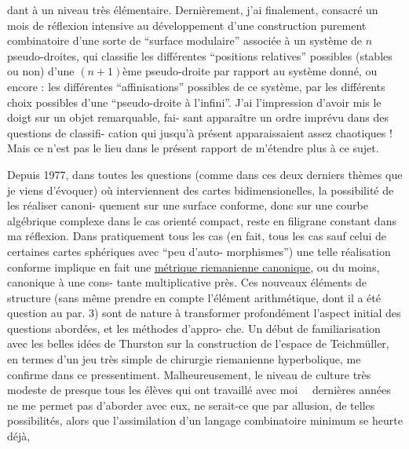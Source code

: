 
dant à un niveau très élémentaire. Dernièrement, j'ai finalement,
consacré un mois de réflexion intensive au développement d'une
construction purement combinatoire d'une sorte de ``surface modulaire''
associée à un système de $n$ pseudo-droites, qui classifie les
différentes ``positions relatives'' possibles (stables ou non) d'une
$(n+1)$ème pseudo-droite par rapport au système donné, ou encore :
les différentes ``affinisations'' possibles de ce système, par les
différents choix possibles d'une ``pseudo-droite à l'infini''. J'ai
l'impression d'avoir mis le doigt sur un objet remarquable, fai-%
sant apparaître un ordre imprévu dans des questions de classifi-%
cation qui jusqu'à présent apparaissaient assez chaotiques !
Mais ce n'est pas le lieu dans le présent rapport de m'étendre plus
à ce sujet.

Depuis 1977, dans toutes les questions (comme dans ces
deux derniers thèmes que je viens d'évoquer) où interviennent des
cartes bidimensionelles, la possibilité de les réaliser canoni-%
quement sur une surface conforme, donc sur une courbe algébrique
complexe dans le cas orienté compact, reste en filigrane constant
dans ma réflexion. Dans pratiquement tous les cas (en fait, tous
les cas sauf celui de certaines cartes sphériques avec ``peu d'auto-%
morphismes'') une telle réalisation conforme implique en fait une
\uline{métrique riemanienne canonique}, ou du moins, canonique à une cons-%
tante multiplicative près. Ces nouveaux éléments de structure
(sans même prendre en compte l'élément arithmétique, dont il a
été question au par. 3) sont de nature à transformer profondément
l'aspect initial des questions abordées, et les méthodes d'appro-%
che. Un début de familiarisation avec les belles idées de Thurston
sur la construction de l'espace de Teichmüller, en termes d'un jeu
très simple de chirurgie riemanienne hyperbolique, me confirme
dans ce pressentiment. Malheureusement, le niveau de culture très
modeste de presque tous les élèves qui ont travaillé avec moi \ \ dernières années ne me permet pas d'aborder avec eux,
ne serait-ce que par allusion, de telles possibilités, alors que
l'assimilation d'un langage combinatoire minimum se heurte déjà,

